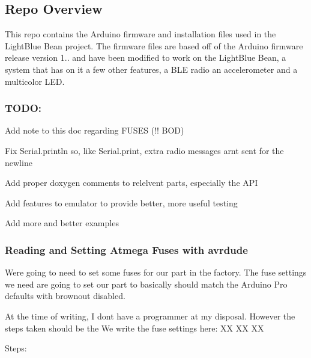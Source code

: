 \subsection*{Repo Overview }

This repo contains the Arduino firmware and installation files used in the Light\+Blue Bean project. The firmware files are based off of the Arduino firmware release version 1.. and have been modified to work on the Light\+Blue Bean, a system that has on it a few other features, a B\+LE radio an accelerometer and a multicolor L\+ED.

\subsubsection*{T\+O\+DO\+:}


\begin{DoxyItemize}
\item Add note to this doc regarding F\+U\+S\+ES (!! B\+OD)
\item Fix Serial.\+println so, like Serial.\+print, extra radio messages arn\textquotesingle{}t sent for the newline
\item Add proper doxygen comments to relelvent parts, especially the A\+PI
\item Add features to emulator to provide better, more useful testing
\item Add more and better examples
\end{DoxyItemize}

\subsubsection*{Reading and Setting Atmega Fuses with avrdude}

We\textquotesingle{}re going to need to set some fuses for our part in the factory. The fuse settings we need are going to set our part to basically should match the Arduino Pro defaults with brownout disabled.

At the time of writing, I don\textquotesingle{}t have a programmer at my disposal. However the steps taken should be the We write the fuse settings here\+: XX XX XX

Steps\+:


